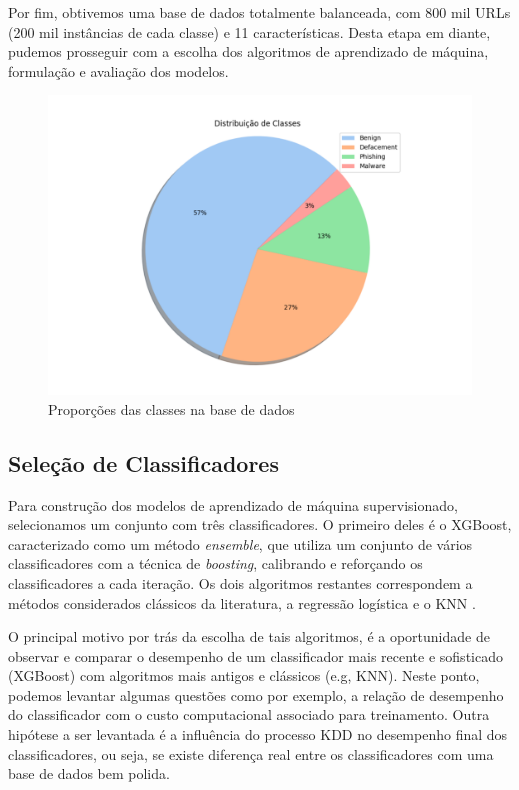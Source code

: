 \documentclass[manuscript,screen,review]{acmart}
\begin{document}
Por fim, obtivemos uma base de dados totalmente balanceada, com 800 mil URLs (200 mil instâncias de cada classe) e 11 características. Desta etapa em diante, pudemos prosseguir com a escolha dos algoritmos de aprendizado de máquina, formulação e avaliação dos modelos.

\begin{figure}[H]
    \centering
    \includegraphics[width=1\textwidth]{pic/class.pdf}
    \caption{Proporções das classes na base de dados}
    \label{fig:exampleFig2}
\end{figure}

\subsection{Seleção de Classificadores}

Para construção dos modelos de aprendizado de máquina supervisionado, selecionamos um conjunto com três classificadores. O primeiro deles é o XGBoost, caracterizado como um método \emph{ensemble}, que utiliza um conjunto de vários classificadores com a técnica de \emph{boosting}, calibrando e reforçando os classificadores a cada iteração. Os dois algoritmos restantes correspondem a métodos considerados clássicos da literatura, a regressão logística e o KNN \cite{fix1951discriminatory}.

O principal motivo por trás da escolha de tais algoritmos, é a oportunidade de observar e comparar o desempenho de um classificador mais recente e sofisticado (XGBoost) com algoritmos mais antigos e clássicos (e.g, KNN). Neste ponto, podemos levantar algumas questões como por exemplo, a relação de desempenho do classificador com o custo computacional associado para treinamento. Outra hipótese a ser levantada é a influência do processo KDD no desempenho final dos classificadores, ou seja, se existe diferença real entre os classificadores com uma base de dados bem polida.
\end{document}
